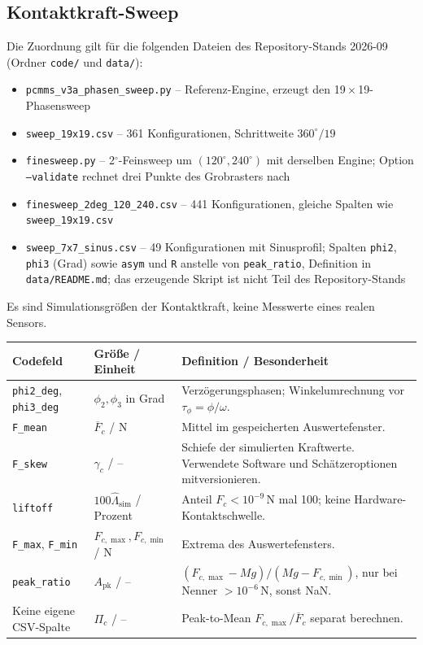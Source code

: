 \documentclass[11pt,a4paper]{article}
\begin{document}
\subsection{Kontaktkraft-Sweep}
Die Zuordnung gilt für die folgenden Dateien des Repository-Stands 2026-09 (Ordner \texttt{code/} und \texttt{data/}):
\begin{itemize}
\item \texttt{pcmms\_v3a\_phasen\_sweep.py} -- Referenz-Engine, erzeugt den 19\,$\times$\,19-Phasensweep
\item \texttt{sweep\_19x19.csv} -- 361 Konfigurationen, Schrittweite $360^\circ/19$
\item \texttt{finesweep.py} -- 2$^\circ$-Feinsweep um $(120^\circ,240^\circ)$ mit derselben Engine; Option \texttt{--validate} rechnet drei Punkte des Grobrasters nach
\item \texttt{finesweep\_2deg\_120\_240.csv} -- 441 Konfigurationen, gleiche Spalten wie \texttt{sweep\_19x19.csv}
\item \texttt{sweep\_7x7\_sinus.csv} -- 49 Konfigurationen mit Sinusprofil; Spalten \texttt{phi2}, \texttt{phi3} (Grad) sowie \texttt{asym} und \texttt{R} anstelle von \texttt{peak\_ratio}, Definition in \texttt{data/README.md}; das erzeugende Skript ist nicht Teil des Repository-Stands
\end{itemize} Es sind Simulationsgrößen der Kontaktkraft, keine Messwerte eines realen Sensors.
\begin{longtable}{@{}L{.24\textwidth}L{.24\textwidth}L{.47\textwidth}@{}}
\toprule\textbf{Codefeld}&\textbf{Größe / Einheit}&\textbf{Definition / Besonderheit}\\\midrule\endhead
\texttt{phi2\_deg}, \texttt{phi3\_deg}&$\phi_2,\phi_3$ in Grad&Verzögerungsphasen; Winkelumrechnung vor $\tau_\phi=\phi/\omega$.\\
\texttt{F\_mean}&$\overline F_c$ / N&Mittel im gespeicherten Auswertefenster.\\
\texttt{F\_skew}&$\gamma_c$ / --&Schiefe der simulierten Kraftwerte. Verwendete Software und Schätzeroptionen mitversionieren.\\
\texttt{liftoff}&$100\hat\Lambda_{\mathrm{sim}}$ / Prozent&Anteil $F_c<10^{-9}\,\mathrm N$ mal 100; keine Hardware-Kontaktschwelle.\\
\texttt{F\_max}, \texttt{F\_min}&$F_{c,\max},F_{c,\min}$ / N&Extrema des Auswertefensters.\\
\texttt{peak\_ratio}&$A_{\mathrm{pk}}$ / --&$(F_{c,\max}-Mg)/(Mg-F_{c,\min})$, nur bei Nenner $>10^{-6}\,\mathrm N$, sonst NaN.\\
Keine eigene CSV-Spalte&$\Pi_c$ / --&Peak-to-Mean $F_{c,\max}/\overline F_c$ separat berechnen.\\
\bottomrule\end{longtable}
\end{document}
